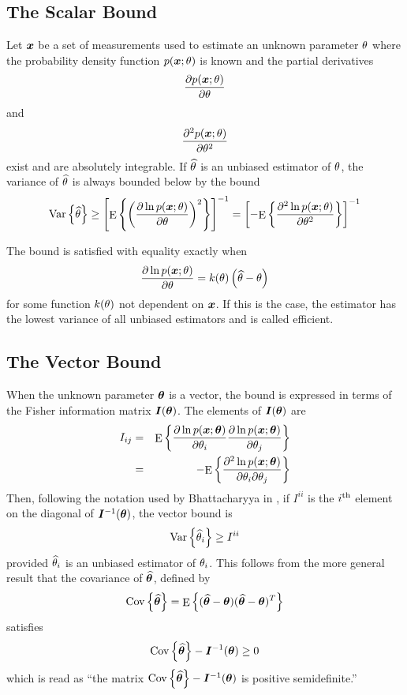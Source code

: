 \subsection{The Scalar \CR Bound}

Let $\bm{x}$ be a set of measurements used to estimate an unknown parameter
$\theta$ where the probability density function $p(\bm{x};\theta)$ is known and the 
partial derivatives
$$\frac{{\partial} p(\bm{x};\theta)}{{\partial}\theta}$$
and
$$\frac{{\partial}^2p(\bm{x};\theta)}{{\partial} \theta^2}$$
exist and are absolutely integrable.
If $\widehat{\theta}$ is an unbiased estimator of $\theta$, the variance of $\widehat{\theta}$
is always bounded below by the \CR bound
\begin{equation}
{\mathop{\rm Var}\nolimits\left\{\widehat{\theta}\right\}}\geq \left[{\mathop{\rm E}\nolimits\left\{\left(\frac{{\partial}\ln p(\bm{x};\theta)}
{{\partial} \theta}\right)^2\right\}}\right]^{-1}
=\left[-{\mathop{\rm E}\nolimits\left\{\frac{{\partial}^2\ln p(\bm{x};\theta)}
{{\partial}\theta^2}\right\}}\right]^{-1}
\end{equation}

The \CR bound is satisfied with equality exactly when 
\begin{equation}\label{mp eqn:NSCforCRB}
\frac{{\partial}\ln p(\bm{x};\theta)}{{\partial}\theta}=k(\theta)\left(\widehat{\theta}-\theta\right)
\end{equation}
for some function $k(\theta)$ not dependent on $\bm{x}$.
If this is the case, the estimator has the lowest variance of
all unbiased estimators and is called efficient.

\subsection{The Vector \CR Bound}

When the unknown parameter $\bm{\theta}$ is a vector, the \CR bound is expressed in
terms of the Fisher information matrix $\bm{I}(\bm{\theta})$.  The elements of
$\bm{I}(\bm{\theta})$ are
\begin{eqnarray}
I_{ij}&=&{\mathop{\rm E}\nolimits\left\{\frac{{\partial}\ln p(\bm{x};\bm{\theta})}{{\partial}\theta_{i}}
\frac{{\partial}\ln p(\bm{x};\bm{\theta})}{{\partial} \theta_{j}}\right\}}{\nonumber}\\
&=&-{\mathop{\rm E}\nolimits\left\{\frac{{\partial}^2\ln p(\bm{x};\bm{\theta})}{{\partial}\theta_{i}{\partial}\theta_{j}}\right\}}
\end{eqnarray}
Then, following the notation used by Bhattacharyya in \cite{Bha46},
if $I^{ii}$ is the $i^{\rm th}$ element on the diagonal of 
$\bm{I}^{-1}(\bm{\theta})$, the vector \CR bound is
\begin{equation}
{\mathop{\rm Var}\nolimits\left\{\widehat{\theta}_{i}\right\}}\geq I^{ii}
\end{equation}
provided $\widehat{\theta}_{i}$ is an unbiased estimator of $\theta_{i}$.  This follows from 
the more general result that the covariance of $\widehat{\bm{\theta}}$,
defined by
\begin{equation}
{\mathop{\rm Cov}\nolimits\left\{\widehat{\bm{\theta}}\right\}}={\mathop{\rm E}\nolimits\left\{(\widehat{\bm{\theta}}-\bm{\theta})(\widehat{\bm{\theta}}-\bm{\theta})^T\right\}}
\end{equation}
satisfies 
\begin{equation}
{\mathop{\rm Cov}\nolimits\left\{\widehat{\bm{\theta}}\right\}}-\bm{I}^{-1}(\bm{\theta})\geq 0
\end{equation}
which is read as ``the matrix ${\mathop{\rm Cov}\nolimits\left\{\widehat{\bm{\theta}}\right\}}-\bm{I}^{-1}(\bm{\theta})$
is positive semidefinite.''

